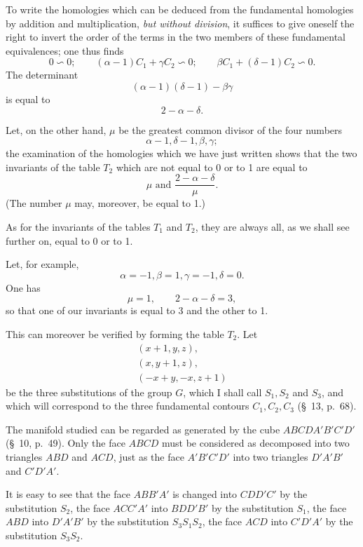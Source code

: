 \documentclass{article}
\begin{document}
To write the homologies which can be deduced from the fundamental homologies by addition and multiplication, \emph{but without division}, it suffices to give oneself the right to invert the order of the terms in the two members of these fundamental equivalences; one thus finds
\[ 0 \backsim 0; \qquad (\alpha-1) C_{1} + \gamma C_{2} \backsim 0; \qquad \beta C_{1} + (\delta-1) C_{2} \backsim 0. \]
The determinant
\[ (\alpha-1)(\delta-1) - \beta\gamma \]
is equal to
\[ 2 - \alpha - \delta. \]

Let, on the other hand, $\mu$ be the greatest common divisor of the four numbers
\[ \alpha-1, \delta-1, \beta, \gamma; \]
the examination of the homologies which we have just written shows that the two invariants of the table $T_{2}$ which are not equal to 0 or to 1 are equal to
\[ \mu \text{ and } \frac{2-\alpha-\delta}{\mu}. \]
(The number $\mu$ may, moreover, be equal to 1.)

As for the invariants of the tables $T_{1}$ and $T_{2}$, they are always all, as we shall see further on, equal to 0 or to 1.

Let, for example,
\[ \alpha = -1, \beta = 1, \gamma = -1, \delta = 0. \]
One has
\[ \mu = 1, \qquad 2-\alpha-\delta = 3, \]
so that one of our invariants is equal to 3 and the other to 1.

This can moreover be verified by forming the table $T_{2}$. Let
\[ \begin{gathered} (x+1, y, z),\\ (x, y+1, z),\\ (-x+y, -x, z+1) \end{gathered} \]
be the three substitutions of the group $G$, which I shall call $S_{1}, S_{2}$ and $S_{3}$, and which will correspond to the three fundamental contours $C_{1}, C_{2}, C_{3}$ (\S~13, p.\ 68).

The manifold studied can be regarded as generated by the cube $ABCDA'B'C'D'$ (\S~10, p.\ 49). Only the face $ABCD$ must be considered as decomposed into two triangles $ABD$ and $ACD$, just as the face $A'B'C'D'$ into two triangles $D'A'B'$ and $C'D'A'$.

It is easy to see that the face $ABB'A'$ is changed into $CDD'C'$ by the substitution $S_{2}$, the face $ACC'A'$ into $BDD'B'$ by the substitution $S_{1}$, the face $ABD$ into $D'A'B'$ by the substitution $S_{3} S_{1} S_{2}$, the face $ACD$ into $C'D'A'$ by the substitution $S_{3} S_{2}$.
\end{document}
